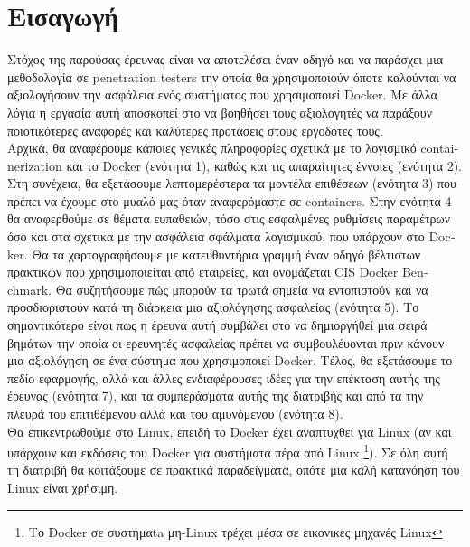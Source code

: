 \section{Εισαγωγή}
\label{introduction}


Στόχος της παρούσας έρευνας είναι να αποτελέσει έναν οδηγό και να παράσχει
μια μεθοδολογία σε \textlatin{penetration testers} την οποία θα χρησιμοποιούν
όποτε καλούνται να αξιολογήσουν την ασφάλεια ενός συστήματος που χρησιμοποιεί
\textlatin{Docker}. Με άλλα λόγια η εργασία αυτή αποσκοπεί στο να βοηθήσει τους
αξιολογητές να παράξουν ποιοτικότερες αναφορές και καλύτερες προτάσεις στους
εργοδότες τους.\mbox{} \\

Αρχικά, θα αναφέρουμε κάποιες γενικές
πληροφορίες σχετικά με το λογισμικό \textlatin{containerization} και το
\textlatin{Docker} (ενότητα 1), καθώς και τις απαραίτητες έννοιες (ενότητα 2).
Στη συνέχεια, θα εξετάσουμε λεπτομερέστερα
τα μοντέλα επιθέσεων (ενότητα 3) που πρέπει να έχουμε στο μυαλό μας όταν
αναφερόμαστε σε \textlatin{containers}.
Στην ενότητα 4 θα αναφερθούμε σε θέματα ευπαθειών, τόσο στις εσφαλμένες
ρυθμίσεις παραμέτρων όσο και στα σχετικα με την ασφάλεια
σφάλματα λογισμικού, που υπάρχουν στο \textlatin{Docker}. Θα τα χαρτογραφήσουμε
με κατευθυντήρια γραμμή έναν οδηγό βέλτιστων πρακτικών που
χρησιμοποιείται από εταιρείες, και ονομάζεται
\textlatin{CIS Docker Benchmark}. 
Θα συζητήσουμε πώς μπορούν τα τρωτά σημεία να εντοπιστούν και να προσδιοριστούν
κατά τη διάρκεια μια αξιολόγησης ασφαλείας (ενότητα 5). Το σημαντικότερο είναι
πως η έρευνα αυτή συμβάλει στο να δημιοργήθεί μια σειρά βημάτων την οποία οι
ερευνητές ασφαλείας πρέπει να συμβουλέυονται πριν κάνουν μια αξιολόγηση σε ένα
σύστημα που χρησιμοποιεί \textlatin{Docker}. Τέλος, θα εξετάσουμε το πεδίο
εφαρμογής, αλλά και άλλες ενδιαφέρουσες ιδέες για την επέκταση αυτής της
έρευνας (ενότητα 7), και τα συμπεράσματα αυτής της διατριβής και από
τα την πλευρά του επιτιθέμενου αλλά και του αμυνόμενου  (ενότητα 8).\mbox{} \\

Θα επικεντρωθούμε στο \textlatin{Linux}, επειδή το \textlatin{Docker} έχει αναπτυχθεί για
\textlatin{Linux} (αν και υπάρχουν και εκδόσεις του \textlatin{Docker} για συστήματα πέρα από \textlatin{Linux} \footnote{Το \textlatin{Docker} σε συστήμαta μη-\textlatin{Linux} τρέχει μέσα σε εικονικές μηχανές \textlatin{Linux}}).
Σε όλη αυτή τη διατριβή θα κοιτάξουμε σε πρακτικά παραδείγματα, οπότε μια καλή
κατανόηση του \textlatin{Linux} είναι χρήσιμη.
